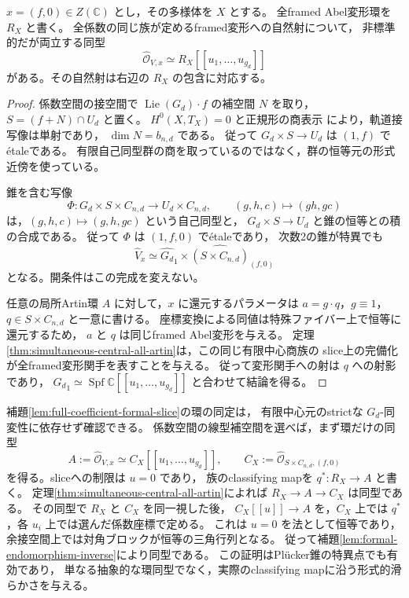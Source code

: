 \begin{lemma}[全パラメータ空間の形式的な座標自由度]
\label{lem:full-coefficient-formal-slice}
$x=(f,0)\in Z(\mathbb C)$ とし，その多様体を $X$ とする。
全framed Abel変形環を $R_X$ と書く。
全係数の同じ族が定めるframed変形への自然射について，
非標準的だが両立する同型
\begin{equation}\label{eq:full-coefficient-formal-product}
 \widehat{\mathcal O}_{V,x}
       \simeq R_X[[u_1,\ldots,u_{g_d}]]
\end{equation}
がある。その自然射は右辺の $R_X$ の包含に対応する。
\end{lemma}
\begin{proof}
係数空間の接空間で
$\operatorname{Lie}(G_d)\cdot f$ の補空間 $N$ を取り，
$S=(f+N)\cap U_d$ と置く。
$H^0(X,T_X)=0$ と正規形の商表示
\cite[定理8.8]{PoissonDP}により，軌道接写像は単射であり，
$\dim N=b_{n,d}$ である。
従って $G_d\times S\to U_d$ は $(1,f)$ で\'{e}taleである。
有限自己同型群の商を取っているのではなく，群の恒等元の形式近傍を使っている。

錐を含む写像
\[
 \Phi:G_d\times S\times C_{n,d}\longrightarrow U_d\times C_{n,d},
 \qquad(g,h,c)\longmapsto(gh,gc)
\]
は，$(g,h,c)\mapsto(g,h,gc)$ という自己同型と，
$G_d\times S\to U_d$ と錐の恒等との積の合成である。
従って $\Phi$ は $(1,f,0)$ で\'{e}taleであり，
次数2の錐が特異でも
\[
 \widehat V_x\simeq
     \widehat{G_d}_1\times\widehat{(S\times C_{n,d})}_{(f,0)}
\]
となる。開条件はこの完成を変えない。

任意の局所Artin環 $A$ に対して，$x$ に還元するパラメータは
$a=g\cdot q$，$g\equiv1$，$q\in S\times C_{n,d}$ と一意に書ける。
座標変換による同値は特殊ファイバー上で恒等に還元するため，
$a$ と $q$ は同じframed Abel変形を与える。
定理\ref{thm:simultaneous-central-all-artin}は，この同じ有限中心商族の
slice上の完備化が全framed変形関手を表すことを与える。
従って変形関手への射は $q$ への射影であり，
$\widehat{G_d}_1\simeq\operatorname{Spf}\mathbb C[[u_1,\ldots,u_{g_d}]]$
と合わせて結論を得る。
\end{proof}

\begin{remark}
\label{rem:formal-slice-without-strict-equivariance}
補題\ref{lem:full-coefficient-formal-slice}の環の同定は，
有限中心元のstrictな $G_d$-同変性に依存せず確認できる。
係数空間の線型補空間を選べば，まず環だけの同型
\[
 A:=\widehat{\mathcal O}_{V,x}\simeq C_X[[u_1,\ldots,u_{g_d}]],
 \qquad C_X:=\widehat{\mathcal O}_{S\times C_{n,d},(f,0)}
\]
を得る。sliceへの制限は $u=0$ であり，
族のclassifying mapを $q^*:R_X\to A$ と書く。
定理\ref{thm:simultaneous-central-all-artin}によれば
$R_X\to A\to C_X$ は同型である。
その同型で $R_X$ と $C_X$ を同一視した後，
$C_X[[u]]\to A$ を，$C_X$ 上では $q^*$，各 $u_i$ 上では選んだ係数座標で定める。
これは $u=0$ を法として恒等であり，余接空間上では対角ブロックが恒等の三角行列となる。
従って補題\ref{lem:formal-endomorphism-inverse}により同型である。
この証明はPl\"ucker錐の特異点でも有効であり，
単なる抽象的な環同型でなく，実際のclassifying mapに沿う形式的滑らかさを与える。
\end{remark}


